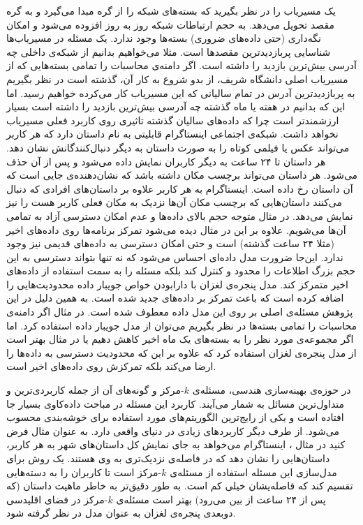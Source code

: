 یک مسیریاب  را در نظر بگیرید که بسته‌های  شبکه را از گره  مبدا می‌گیرد و به گره مقصد تحویل می‌دهد. به حجم ارتباطات شبکه روز به روز افزوده می‌شود و امکان نگه‌داری (حتی داده‌های ضروری) بسته‌ها وجود ندارد. یک مسئله در مسیریاب‌ها شناسایی پربازدیدترین مقصدها است. مثلا می‌خواهیم بدانیم از شبکه‌ی داخلی  چه آدرسی بیش‌ترین بازدید را داشته است. اگر دامنه‌ی محاسبات را تمامی بسته‌هایی که از مسیریاب اصلی دانشگاه شریف، از بدو شروع به کار آن، گذشته است در نظر بگیریم به پربازدیدترین آدرس در تمام سالیانی که این مسیریاب کار می‌کرده خواهیم رسید. اما این که بدانیم در هفته یا ماه گذشته چه آدرسی بیش‌ترین بازدید را داشته است بسیار ارزشمندتر است چرا که داده‌های سالیان گذشته تاثیری روی کاربرد فعلی مسیریاب نخواهد داشت.
شبکه‌ی اجتماعی اینستاگرام  قابلیتی به نام داستان  دارد که هر کاربر می‌تواند عکس یا فیلمی کوتاه را به صورت داستان به دیگر دنبال‌کنندگانش نشان دهد. هر داستان تا ۲۴ ساعت به دیگر کاربران نمایش داده می‌شود و پس از آن حذف می‌شود. هر داستان می‌تواند برچسب مکان داشته باشد که نشان‌دهنده‌ی جایی است که آن داستان رخ داده است. اینستاگرام به هر کاربر علاوه بر داستان‌های افرادی که دنبال می‌کنند داستان‌هایی که برچسب مکان آن‌ها نزدیک به مکان فعلی کاربر هست را نیز نمایش می‌دهد.
در مثال  متوجه حجم بالای داده‌ها و عدم امکان دسترسی آزاد به تمامی آن‌ها می‌شویم. علاوه بر این در مثال  دیده می‌شود تمرکز برنامه‌ها روی داده‌های اخیر (مثلا ۲۴ ساعت گذشته) است و حتی امکان دسترسی به داده‌های قدیمی نیز وجود ندارد.
این‌جا ضرورت مدل‌ داده‌ای احساس می‌شود که نه تنها بتواند دسترسی به این حجم بزرگ اطلاعات را محدود و کنترل کند بلکه مسئله را به سمت استفاده از داده‌های اخیر متمرکز کند. مدل پنجره‌ی لغزان با دارابودن خواص جویبار داده محدودیت‌هایی را اضافه کرده است که باعث تمرکز بر داده‌های جدید شده است. به همین دلیل در این پژوهش مسئله‌ی اصلی بر روی این مدل داده معطوف شده است.
در مثال  اگر دامنه‌ی محاسبات را تمامی بسته‌ها در نظر بگیریم می‌توان از مدل جویبار داده استفاده کرد. اما اگر مجموعه‌ی مورد نظر را به بسته‌های یک ماه اخیر کاهش دهیم یا در مثال  بهتر است از مدل پنجره‌ی لغزان استفاده کرد که علاوه بر این که محدودیت دسترسی به داده‌ها را ارضا می‌کند بلکه تمرکزش روی داده‌های اخیر است.

در حوزه‌ی بهینه‌سازی هندسی، مسئله‌ی $k$-مرکز و گونه‌های آن از جمله کاربردی‌ترین و متداول‌ترین مسائل به شمار می‌آیند. کاربرد این مسئله در مباحث داده‌کاوی بسیار جا افتاده است و یکی از رایج‌ترین الگوریتم‌های مورد استفاده برای خوشه‌بندی محسوب می‌شود. از طرف دیگر کاربردهای زیادی در دنیای واقعی دارد.
 به عنوان مثال فرض کنید در مثال ، اینستاگرام می‌خواهد به جای نمایش کل داستان‌های شهر به هر کاربر، داستان‌هایی را نشان دهد که در فاصله‌ی نزدیک‌تری به وی هستند. یک روش برای مدل‌سازی این مسئله استفاده از مسئله‌ی $k$-مرکز است تا کاربران را به دسته‌هایی تقسیم کند که فاصله‌‌یشان خیلی کم است. به طور دقیق‌تر به خاطر ماهیت داستان (که پس از ۲۴ ساعت از بین می‌رود) بهتر است مسئله‌ی $k$-مرکز در فضای اقلیدسی دوبعدی پنجره‌ی لغزان به عنوان مدل در نظر گرفته شود.

